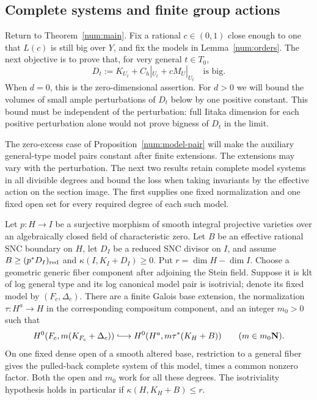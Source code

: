 \subsection{Complete systems and finite group actions}

Return to Theorem~\ref{num:main}. Fix a rational $c\in(0,1)$ close
enough to one that $L(c)$ is still big over $Y$, and fix the models
in Lemma~\ref{num:orders}. The next objective is to prove that, for
very general $t\in T_0$,
\begin{equation}\label{num:fiber-big}
 D_t:=K_{U_t}+C_h|_{U_t}+cM_U|_{U_t}\quad\text{is big}.
\end{equation}
When $d=0$, this is the zero-dimensional assertion. For $d>0$ we
will bound the volumes of small ample perturbations of $D_t$ below
by one positive constant. This bound must be independent of the
perturbation: full Iitaka dimension for each positive perturbation
alone would not prove bigness of $D_t$ in the limit.

The zero-excess case of Proposition~\ref{num:model-pair} will make
the auxiliary general-type model pairs constant after finite
extensions. The extensions may vary with the perturbation. The next
two results retain complete model systems in all divisible degrees
and bound the loss when taking invariants by the effective action
on the section image. The first supplies one fixed normalization
and one fixed open set for every required degree of each such model.

\begin{proposition}
\label{num:full-systems}
Let $p:H\to I$ be a surjective morphism of smooth integral
projective varieties over an algebraically closed field of
characteristic zero. Let $B$ be an effective rational SNC boundary on
$H$, let $D_I$ be a reduced SNC divisor on $I$, and assume
$B\geq(p^*D_I)_{\mathrm{red}}$ and $\kappa(I,K_I+D_I)\geq0$.
Put $r=\dim H-\dim I$. Choose a geometric generic fiber
component after adjoining the Stein field. Suppose it is klt of log
general type and its log canonical model pair is isotrivial; denote
its fixed model by $(F_c,\Delta_c)$. There are a finite Galois base
extension, the normalization $\tau:H^a\to H$ in the corresponding
compositum component, and an integer $m_0>0$ such that
\begin{equation}\label{num:full-system-injection}
 H^0(F_c,m(K_{F_c}+\Delta_c))
 \lhook\joinrel\longrightarrow H^0(H^a,m\tau^*(K_H+B))
 \qquad(m\in m_0\N).
\end{equation}
On one fixed dense open of a smooth altered base, restriction to a
general fiber gives the pulled-back complete system of this model,
times a common nonzero factor. Both the open and $m_0$ work for all
these degrees. The isotriviality hypothesis holds in particular if
$\kappa(H,K_H+B)\leq r$.
\end{proposition}

